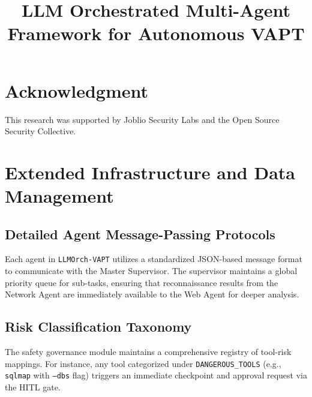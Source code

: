 \documentclass[conference,compsoc]{IEEEtran}
\begin{document}
\title{LLM Orchestrated Multi-Agent Framework for Autonomous VAPT}

\author{
}

\maketitle









\section*{Acknowledgment}
This research was supported by Joblio Security Labs and the Open Source Security Collective.




\appendices
\section{Extended Infrastructure and Data Management}
\subsection{Detailed Agent Message-Passing Protocols}
Each agent in \texttt{LLMOrch-VAPT} utilizes a standardized JSON-based message format to communicate with the Master Supervisor. The supervisor maintains a global priority queue for sub-tasks, ensuring that reconnaissance results from the Network Agent are immediately available to the Web Agent for deeper analysis.

\subsection{Risk Classification Taxonomy}
The safety governance module maintains a comprehensive registry of tool-risk mappings. For instance, any tool categorized under \texttt{DANGEROUS\_TOOLS} (e.g., \texttt{sqlmap} with \texttt{--dbs} flag) triggers an immediate checkpoint and approval request via the HITL gate.
\end{document}
